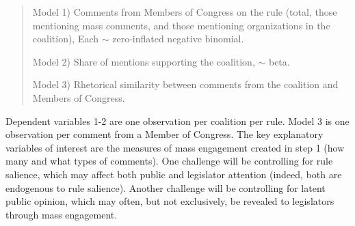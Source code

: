 \begin{quote}

Model 1) Comments from Members of Congress on the rule (total, those mentioning mass comments, and those mentioning organizations in the coalition), Each  $\sim$ zero-inflated negative binomial. 

Model 2) Share of mentions supporting the coalition,  $\sim$  beta. 

Model 3) Rhetorical similarity between comments from the coalition and Members of Congress. 
\end{quote}

Dependent variables 1-2 are one observation per coalition per rule. Model 3 is one observation per comment from a Member of Congress. The key explanatory variables of interest are the measures of mass engagement created in step 1 (how many and what types of comments). One challenge will be controlling for rule salience, which may affect both public and legislator attention (indeed, both are endogenous to rule salience). Another challenge will be controlling for latent public opinion, which may often, but not exclusively, be revealed to legislators through mass engagement.%

